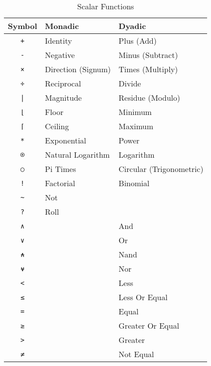 \documentclass[numbers,preprint]{sigplanconf}
\begin{document}
\begin{table}
\centering
\begin{tabular}{cll}
\toprule
Symbol                   & Monadic            & Dyadic \\
\midrule
\texttt{+}               & Identity           & Plus (Add) \\
\texttt{-}               & Negative           & Minus (Subtract) \\
\texttt{×}               & Direction (Signum) & Times (Multiply) \\
\texttt{÷}               & Reciprocal         & Divide \\
\texttt{|}               & Magnitude          & Residue (Modulo) \\
\texttt{⌊}               & Floor              & Minimum \\
\texttt{⌈}               & Ceiling            & Maximum \\
\texttt{*}               & Exponential        & Power \\
\texttt{⍟}               & Natural Logarithm  & Logarithm \\
\texttt{○}               & Pi Times           & Circular (Trigonometric) \\
\texttt{!}               & Factorial          & Binomial \\
\texttt{\textasciitilde} & Not                & \\
\texttt{?}               & Roll               & \\
\texttt{∧}              &                    & And \\
\texttt{∨}               &                    & Or \\
\texttt{⍲}               &                    & Nand \\
\texttt{⍱}               &                    & Nor \\
\texttt{<}               &                    & Less \\
\texttt{≤}               &                    & Less Or Equal \\
\texttt{=}               &                    & Equal \\
\texttt{≥}               &                    & Greater Or Equal \\
\texttt{>}               &                    & Greater \\
\texttt{≠}               &                    & Not Equal \\
\end{tabular}
\caption{Scalar Functions}
\label{tab:scalarprims}
\end{table}
\end{document}
